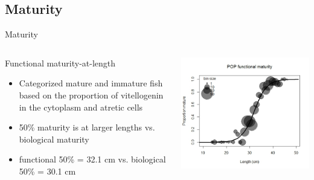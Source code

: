 \documentclass[pdf]{beamer}\usepackage[]{graphicx}\usepackage[]{color}
\begin{document}
\subsection{Maturity}
\begin{frame}{Maturity}
\begin{columns}
  \begin{column}{0.55\textwidth}
      Functional maturity-at-length
      \begin{itemize}
        \item Categorized mature and immature fish based on the proportion of vitellogenin in the cytoplasm and atretic cells
        \item 50\% maturity is at larger lengths vs. biological maturity
        \item functional 50\% = 32.1 cm vs. biological 50\% = 30.1 cm
      \end{itemize}
  \end{column}
  
  \begin{column}{0.45\textwidth}
  \begin{center}
    \includegraphics[scale = 0.40]{figures/Functional_Maturity.png}
  \end{center}
  \end{column}
\end{columns}
\end{frame}
\end{document}
